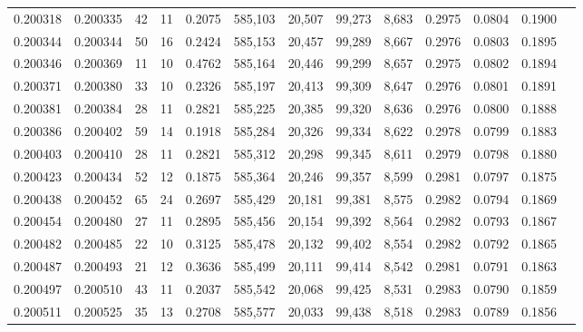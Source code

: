 \begin{tabular}{rrrrrrrrrrrrr}
0.200318 & 0.200335 &    42 &  11 &                                     0.2075 & 585,103 &  20,507 &  99,273 &   8,683 & 0.2975 & 0.0804 & 0.1900 \\
0.200344 & 0.200344 &    50 &  16 &                                     0.2424 & 585,153 &  20,457 &  99,289 &   8,667 & 0.2976 & 0.0803 & 0.1895 \\
0.200346 & 0.200369 &    11 &  10 &                                     0.4762 & 585,164 &  20,446 &  99,299 &   8,657 & 0.2975 & 0.0802 & 0.1894 \\
0.200371 & 0.200380 &    33 &  10 &                                     0.2326 & 585,197 &  20,413 &  99,309 &   8,647 & 0.2976 & 0.0801 & 0.1891 \\
0.200381 & 0.200384 &    28 &  11 &                                     0.2821 & 585,225 &  20,385 &  99,320 &   8,636 & 0.2976 & 0.0800 & 0.1888 \\
0.200386 & 0.200402 &    59 &  14 &                                     0.1918 & 585,284 &  20,326 &  99,334 &   8,622 & 0.2978 & 0.0799 & 0.1883 \\
0.200403 & 0.200410 &    28 &  11 &                                     0.2821 & 585,312 &  20,298 &  99,345 &   8,611 & 0.2979 & 0.0798 & 0.1880 \\
0.200423 & 0.200434 &    52 &  12 &                                     0.1875 & 585,364 &  20,246 &  99,357 &   8,599 & 0.2981 & 0.0797 & 0.1875 \\
0.200438 & 0.200452 &    65 &  24 &                                     0.2697 & 585,429 &  20,181 &  99,381 &   8,575 & 0.2982 & 0.0794 & 0.1869 \\
0.200454 & 0.200480 &    27 &  11 &                                     0.2895 & 585,456 &  20,154 &  99,392 &   8,564 & 0.2982 & 0.0793 & 0.1867 \\
0.200482 & 0.200485 &    22 &  10 &                                     0.3125 & 585,478 &  20,132 &  99,402 &   8,554 & 0.2982 & 0.0792 & 0.1865 \\
0.200487 & 0.200493 &    21 &  12 &                                     0.3636 & 585,499 &  20,111 &  99,414 &   8,542 & 0.2981 & 0.0791 & 0.1863 \\
0.200497 & 0.200510 &    43 &  11 &                                     0.2037 & 585,542 &  20,068 &  99,425 &   8,531 & 0.2983 & 0.0790 & 0.1859 \\
0.200511 & 0.200525 &    35 &  13 &                                     0.2708 & 585,577 &  20,033 &  99,438 &   8,518 & 0.2983 & 0.0789 & 0.1856 \\

\end{tabular}

